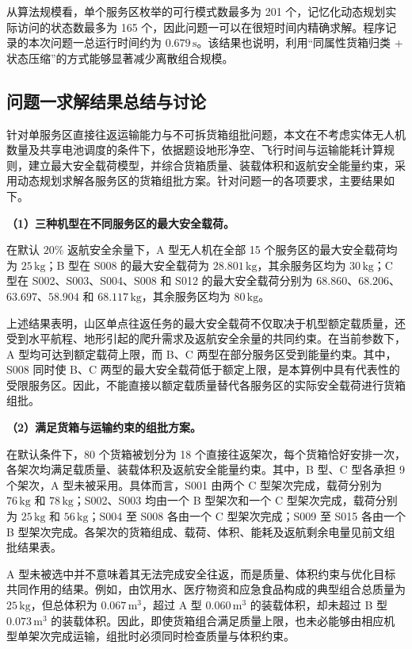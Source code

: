 \documentclass[bwprint,fontset=fandol]{gmcmthesis}
\begin{document}
从算法规模看，单个服务区枚举的可行模式数最多为 201 个，记忆化动态规划实际访问的状态数最多为 165 个，因此问题一可以在很短时间内精确求解。程序记录的本次问题一总运行时间约为 $0.679\,\mathrm{s}$。该结果也说明，利用“同属性货箱归类 + 状态压缩”的方式能够显著减少离散组合规模。

\subsection{问题一求解结果总结与讨论}

针对单服务区直接往返运输能力与不可拆货箱组批问题，本文在不考虑实体无人机数量及共享电池调度的条件下，依据题设地形净空、飞行时间与运输能耗计算规则，建立最大安全载荷模型，并综合货箱质量、装载体积和返航安全能量约束，采用动态规划求解各服务区的货箱组批方案。针对问题一的各项要求，主要结果如下。

\noindent\textbf{（1）三种机型在不同服务区的最大安全载荷。}

在默认 $20\%$ 返航安全余量下，A 型无人机在全部 15 个服务区的最大安全载荷均为 $25\,\mathrm{kg}$；B 型在 S008 的最大安全载荷为 $28.801\,\mathrm{kg}$，其余服务区均为 $30\,\mathrm{kg}$；C 型在 S002、S003、S004、S008 和 S012 的最大安全载荷分别为 $68.860$、$68.206$、$63.697$、$58.904$ 和 $68.117\,\mathrm{kg}$，其余服务区均为 $80\,\mathrm{kg}$。

上述结果表明，山区单点往返任务的最大安全载荷不仅取决于机型额定载质量，还受到水平航程、地形引起的爬升需求及返航安全余量的共同约束。在当前参数下，A 型均可达到额定载荷上限，而 B、C 两型在部分服务区受到能量约束。其中，S008 同时使 B、C 两型的最大安全载荷低于额定上限，是本算例中具有代表性的受限服务区。因此，不能直接以额定载质量替代各服务区的实际安全载荷进行货箱组批。

\noindent\textbf{（2）满足货箱与运输约束的组批方案。}

在默认条件下，80 个货箱被划分为 18 个直接往返架次，每个货箱恰好安排一次，各架次均满足载质量、装载体积及返航安全能量约束。其中，B 型、C 型各承担 9 个架次，A 型未被采用。具体而言，S001 由两个 C 型架次完成，载荷分别为 $76\,\mathrm{kg}$ 和 $78\,\mathrm{kg}$；S002、S003 均由一个 B 型架次和一个 C 型架次完成，载荷分别为 $25\,\mathrm{kg}$ 和 $56\,\mathrm{kg}$；S004 至 S008 各由一个 C 型架次完成；S009 至 S015 各由一个 B 型架次完成。各架次的货箱组成、载荷、体积、能耗及返航剩余电量见前文组批结果表。

A 型未被选中并不意味着其无法完成安全往返，而是质量、体积约束与优化目标共同作用的结果。例如，由饮用水、医疗物资和应急食品构成的典型组合总质量为 $25\,\mathrm{kg}$，但总体积为 $0.067\,\mathrm{m}^{3}$，超过 A 型 $0.060\,\mathrm{m}^{3}$ 的装载体积，却未超过 B 型 $0.073\,\mathrm{m}^{3}$ 的装载体积。因此，即使货箱组合满足质量上限，也未必能够由相应机型单架次完成运输，组批时必须同时检查质量与体积约束。
\end{document}
